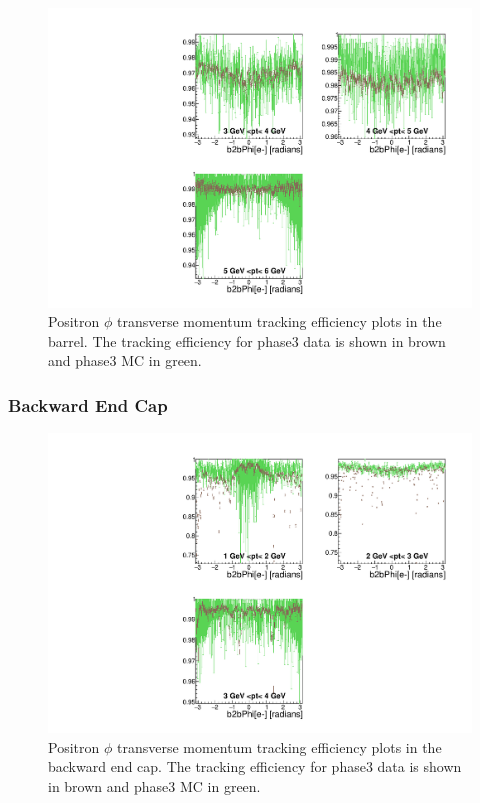 \documentclass[a4paper,11pt,twosided,final,german,openbib,pdftex,listof=totoc,bibliography=totoc]{scrbook}
\begin{document}
\begin{figure}[!htbp]
	\centering
	\includegraphics[width=\textwidth]{Plots/master3/xPtMPhiepBarrelP3}
	\caption[Transverse Momentum $\phi$ Positron Barrel Efficiency Phase3]{Positron $\phi$ transverse momentum tracking efficiency plots in the barrel. The tracking efficiency for phase3 data is shown in brown and phase3 MC in green.}
	\label{plt:xPtMPhiepBarrel3}
\end{figure}


\newpage

\subsubsection{Backward End Cap}




\begin{figure}[!htbp]
	\centering
	\includegraphics[width=\textwidth]{Plots/master3/xPtMPhiepECP3}
	\caption[Transverse Momentum $\phi$ Positron Backward End Cap Efficiency Phase3]{Positron $\phi$ transverse momentum tracking efficiency plots in the backward end cap. The tracking efficiency for phase3 data is shown in brown and phase3 MC in green.}
	
	\label{plt:xPtMPhiepEC3}
\end{figure}
\end{document}
